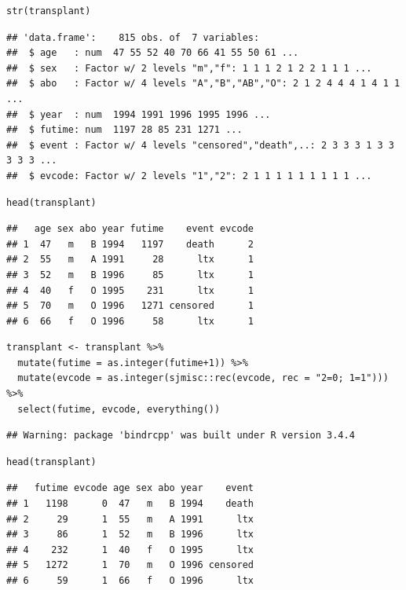 \documentclass[
]{article}
\begin{document}
\begin{verbatim}
str(transplant)
\end{verbatim}

\begin{verbatim}
## 'data.frame':    815 obs. of  7 variables:
##  $ age   : num  47 55 52 40 70 66 41 55 50 61 ...
##  $ sex   : Factor w/ 2 levels "m","f": 1 1 1 2 1 2 2 1 1 1 ...
##  $ abo   : Factor w/ 4 levels "A","B","AB","O": 2 1 2 4 4 4 1 4 1 1 ...
##  $ year  : num  1994 1991 1996 1995 1996 ...
##  $ futime: num  1197 28 85 231 1271 ...
##  $ event : Factor w/ 4 levels "censored","death",..: 2 3 3 3 1 3 3 3 3 3 ...
##  $ evcode: Factor w/ 2 levels "1","2": 2 1 1 1 1 1 1 1 1 1 ...
\end{verbatim}

\begin{verbatim}
head(transplant)
\end{verbatim}

\begin{verbatim}
##   age sex abo year futime    event evcode
## 1  47   m   B 1994   1197    death      2
## 2  55   m   A 1991     28      ltx      1
## 3  52   m   B 1996     85      ltx      1
## 4  40   f   O 1995    231      ltx      1
## 5  70   m   O 1996   1271 censored      1
## 6  66   f   O 1996     58      ltx      1
\end{verbatim}

\begin{verbatim}
transplant <- transplant %>%
  mutate(futime = as.integer(futime+1)) %>% 
  mutate(evcode = as.integer(sjmisc::rec(evcode, rec = "2=0; 1=1"))) %>% 
  select(futime, evcode, everything())
\end{verbatim}

\begin{verbatim}
## Warning: package 'bindrcpp' was built under R version 3.4.4
\end{verbatim}

\begin{verbatim}
head(transplant)
\end{verbatim}

\begin{verbatim}
##   futime evcode age sex abo year    event
## 1   1198      0  47   m   B 1994    death
## 2     29      1  55   m   A 1991      ltx
## 3     86      1  52   m   B 1996      ltx
## 4    232      1  40   f   O 1995      ltx
## 5   1272      1  70   m   O 1996 censored
## 6     59      1  66   f   O 1996      ltx
\end{verbatim}
\end{document}
